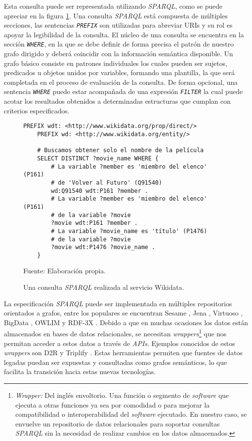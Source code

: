 Esta consulta puede ser representada utilizando \textit{SPARQL}, como se puede apreciar en la figura \ref{fig:graph-pattern-ex-sparql}. Una consulta \textit{SPARQL} está compuesta de múltiples secciones, las sentencias \textit{\texttt{PREFIX}} son utilizadas para abreviar URIs y su rol es apoyar la legibilidad de la consulta. El núcleo de una consulta se encuentra en la sección \textit{\texttt{WHERE}}, en la que se debe definir de forma precisa el patrón de nuestro grafo dirigido y deberá coincidir con la información semántica disponible. Un grafo básico consiste en patrones individuales los cuales pueden ser sujetos, predicados u objetos unidos por variables, formando una plantilla, la que será completada en el proceso de evaluación de la consulta. De forma opcional, una sentencia \textit{\texttt{WHERE}} puede estar acompañada de una expresión \textit{\texttt{FILTER}} la cual puede acotar los resultados obtenidos a determinadas estructuras que cumplan con criterios especificados.

\begin{figure}
    \begin{lstlisting}[language=SPARQL]
    PREFIX wdt: <http://www.wikidata.org/prop/direct/>
    PREFIX wd: <http://www.wikidata.org/entity/>

    # Buscamos obtener solo el nombre de la película
    SELECT DISTINCT ?movie_name WHERE {
        # La variable ?member es 'miembro del elenco' (P161)
        # de 'Volver al Futuro' (Q91540)
        wd:Q91540 wdt:P161 ?member .
        # La variable ?member es 'miembro del elenco' (P161)
        # de la variable ?movie
        ?movie wdt:P161 ?member .
        # La variable ?movie_name es 'título' (P1476)
        # de la variable ?movie
        ?movie wdt:P1476 ?movie_name .
    }
    \end{lstlisting}
    \caption{Una consulta \textit{SPARQL} realizada al servicio Wikidata.}
    Fuente: Elaboración propia.
    \label{fig:graph-pattern-ex-sparql}
\end{figure}

La especificación \textit{SPARQL} puede ser implementada en múltiples repositorios orientados a grafos, entre los populares se encuentran Sesame \cite{broekstra2002sesame}, Jena \cite{mcbride2001jena}, Virtuoso \cite{openlink2015virtuoso}, BigData \cite{thompson2016bigdata}, OWLIM \cite{kiryakov2005owlim} y RDF-3X \cite{neumann2010rdf}. Debido a que en muchas ocasiones los datos están almacenados en bases de datos relacionales, se necesitan \textit{wrappers}\footnote{\textit{Wrapper:} Del inglés envoltorio. Una función o segmento de \textit{software} que ejecuta a otras funciones ya sea por comodidad o para mejorar la compatibilidad o interoperabilidad del \textit{software} ejecutado. En nuestro caso, se envuelve un repositorio de datos relacionales para soportar consultas \textit{SPARQL} sin la necesidad de realizar cambios en los datos almacenados.} que nos permitan acceder a estos datos a través de \textit{APIs}. Ejemplos conocidos de estos \textit{wrappers} son D2R \cite{bizer2006d2r} y Triplify \cite{auer2009triplify}. Estas herramientas permiten que fuentes de datos legadas puedan ser expuestas y consultadas como grafos semánticos, lo que facilita la transición hacia estas nuevas tecnologías.

